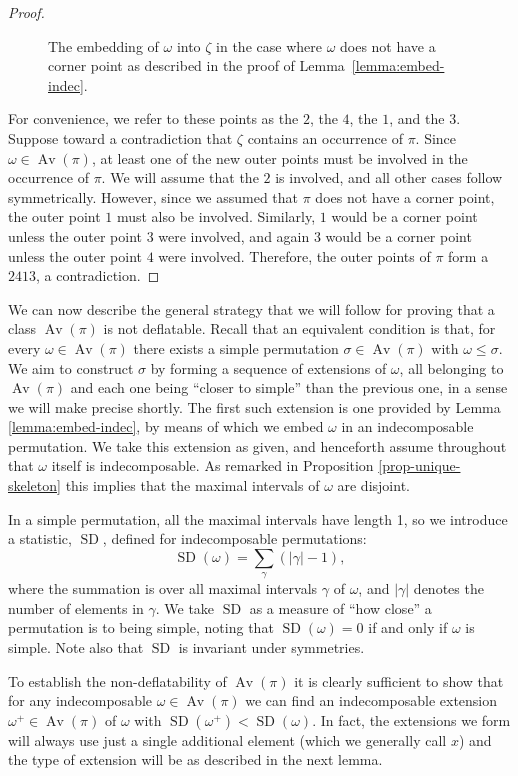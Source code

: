 \documentclass[10pt]{article}
\theoremstyle{plain}
\newcommand{\Av}{\operatorname{Av}}
\newcommand{\ds}{\displaystyle}
\newcommand{\SD}{\operatorname{SD}}
\begin{document}
\begin{proof}
\begin{figure}
\begin{center}
	\end{center}
	\caption{The embedding of $\omega$ into $\zeta$ in the case where $\omega$ does not have a corner point as described in the proof of Lemma~\ref{lemma:embed-indec}.}
	\label{figure:embed-indec-2413}
\end{figure}
For convenience, we refer to these points as the $2$, the $4$, the $1$, and the $3$. Suppose toward a contradiction that $\zeta$ contains an occurrence of $\pi$. Since $\omega \in \Av(\pi)$, at least one of the new outer points must be involved in the occurrence of $\pi$. We will assume that the $2$ is involved, and all other cases follow symmetrically.  However, since we assumed that $\pi$ does not have a corner point, the outer point $1$ must also be involved. Similarly, $1$ would be a corner point unless the outer point $3$ were involved, and again $3$ would be a corner point unless the outer point $4$ were involved. Therefore, the outer points of $\pi$ form a $2413$, a contradiction.
\end{proof}

We can now describe the general strategy that we will follow for proving that a class $\Av(\pi)$ is not deflatable. Recall that an equivalent condition is that, for every $\omega \in \Av(\pi)$ there exists a simple permutation $\sigma \in \Av(\pi)$ with $\omega \leq \sigma$. We aim to construct $\sigma$ by forming a sequence of extensions of $\omega$, all belonging to $\Av(\pi)$ and each one being ``closer to simple'' than the previous one, in a sense we will make precise shortly. The first such extension is one provided by Lemma \ref{lemma:embed-indec}, by means of which we embed $\omega$ in an indecomposable permutation. We take this extension as given, and henceforth assume throughout that $\omega$ itself is indecomposable. As remarked in Proposition \ref{prop-unique-skeleton} this implies that the maximal intervals of $\omega$ are disjoint. 

In a simple permutation, all the maximal intervals have length 1, so we introduce a statistic, $\SD$, defined for indecomposable permutations:
\[
\SD(\omega)  = \ds\sum_\gamma \left(|\gamma|-1\right),
\]
where the summation is over all maximal intervals $\gamma$ of $\omega$, and $|\gamma|$ denotes the number of elements in $\gamma$. We take $\SD$ as a measure of ``how close'' a permutation is to being simple, noting that $\SD(\omega) = 0$ if and only if $\omega$ is simple. Note also that $\SD$ is invariant under symmetries.

To establish the non-deflatability of $\Av(\pi)$ it is clearly sufficient to show that for any indecomposable $\omega \in \Av(\pi)$ we can find an indecomposable extension $\omega^+ \in \Av(\pi)$ of $\omega$ with $\SD(\omega^+) < \SD(\omega)$. In fact, the extensions we form will always use just a single additional element (which we generally call $x$) and the type of extension will be as described in the next lemma.
\end{document}
